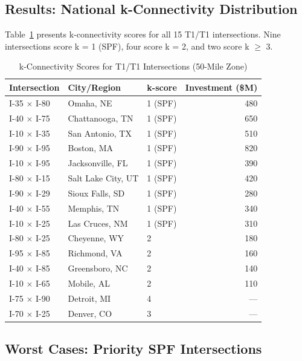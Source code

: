 \subsection{Results: National k-Connectivity Distribution}

Table~\ref{tab:k-connectivity} presents k-connectivity scores for all 15 T1/T1 intersections. Nine intersections score k = 1 (SPF), four score k = 2, and two score k $\geq$ 3.

\begin{table}[h!]
\centering
\caption{k-Connectivity Scores for T1/T1 Intersections (50-Mile Zone)}
\label{tab:k-connectivity}
\begin{tabular}{lllr}
\toprule
\textbf{Intersection} & \textbf{City/Region} & \textbf{k-score} & \textbf{Investment (\$M)} \\
\midrule
I-35 $\times$ I-80     & Omaha, NE          & 1 (SPF)  & 480 \\
I-40 $\times$ I-75     & Chattanooga, TN    & 1 (SPF)  & 650 \\
I-10 $\times$ I-35     & San Antonio, TX    & 1 (SPF)  & 510 \\
I-90 $\times$ I-95     & Boston, MA         & 1 (SPF)  & 820 \\
I-10 $\times$ I-95     & Jacksonville, FL   & 1 (SPF)  & 390 \\
I-80 $\times$ I-15     & Salt Lake City, UT & 1 (SPF)  & 420 \\
I-90 $\times$ I-29     & Sioux Falls, SD    & 1 (SPF)  & 280 \\
I-40 $\times$ I-55     & Memphis, TN        & 1 (SPF)  & 340 \\
I-10 $\times$ I-25     & Las Cruces, NM     & 1 (SPF)  & 310 \\
\midrule
I-80 $\times$ I-25     & Cheyenne, WY       & 2        & 180 \\
I-95 $\times$ I-85     & Richmond, VA       & 2        & 160 \\
I-40 $\times$ I-85     & Greensboro, NC     & 2        & 140 \\
I-10 $\times$ I-65     & Mobile, AL         & 2        & 110 \\
\midrule
I-75 $\times$ I-90     & Detroit, MI        & 4        & ---  \\
I-70 $\times$ I-25     & Denver, CO         & 3        & ---  \\
\bottomrule
\end{tabular}
\end{table}

\subsection{Worst Cases: Priority SPF Intersections}

